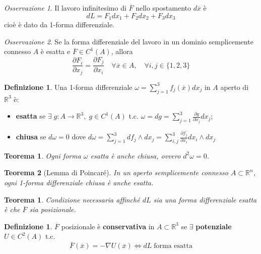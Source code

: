 \documentclass{book}
\theoremstyle{plain}
\newtheorem{teo}{Teorema}[chapter]
\newtheorem*{teo*}{Teorema}
\theoremstyle{plain}
\theoremstyle{plain}
\theoremstyle{plain}
\theoremstyle{plain}
\theoremstyle{definition}
\newtheorem{defi}{Definizione}[chapter]
\newtheorem*{defi*}{Definizione}
\theoremstyle{remark}
\newtheorem*{oss}{Osservazione}
\theoremstyle{definition}
\begin{document}
\begin{oss}
     Il lavoro infinitesimo di $\overline{F}$ nello spostamento $d\overline{x}$ è
     \begin{displaymath}
         d L=F_{1} d x_{1}+F_{2} d x_{2}+F_{3} d x_{3}
     \end{displaymath}
      cioè è dato da 1-forma differenziale.
\end{oss}

\begin{oss}
    Se la forma differenziale del lavoro in un dominio semplicemente connesso $A$ è esatta e $\overline{F} \in C^1(A)$, allora
    \begin{displaymath}
         \frac{\partial F_{i}}{\partial x_{j}}=\frac{\partial F_{j}}{\partial x_{i}} \quad \forall \overline{x} \in A, \quad \forall i, j \in \{1, 2, 3\}
    \end{displaymath}
\end{oss}

\begin{defi*}
\everymath{\displaystyle}
    Una 1-forma differenziale $\omega=\sum_{j=1}^{3} f_{j}(\overline{x}) dx_{j}$ in $A$ aperto di $\mathbb{R}^{3}$ è:
    \begin{itemize}
    \everymath{\displaystyle}
        \item \textbf{esatta} se $\exists \; g: A \to \mathbb{R}^{3}, \; g \in C^{1}(A)$ t.c. $\omega=dg=\sum_{j=1}^{3} \frac{\partial g}{\partial x_{j}} dx_{j}$;
        \item \textbf{chiusa} se $d\omega=0$ dove $d\omega=\sum_{j=1}^{3} df_j \wedge dx_{j}=\sum_{i, j}^{3}\frac{\partial f_j}{\partial x_i}dx_i \wedge dx_j$
    \end{itemize}
\end{defi*}

\begin{teo*}
    Ogni forma $\omega$ esatta è anche chiusa, ovvero $d^{2} \omega=0$.
\end{teo*}

\begin{teo*}[Lemma di Poincaré]
    In un aperto semplicemente connesso $A \subset \mathbb{R}^{n}$, ogni 1-forma differenziale chiusa è anche esatta.
\end{teo*}

\begin{teo}
    Condizione necessaria affinché $dL$ sia una forma differenziale esatta è che $\overline{F}$ sia posizionale.
\end{teo}

\begin{defi}
    $\overline{F}$ posizionale è \textbf{conservativa} in $A \subset \mathbb{R}^{3}$ se $\exists$ \textbf{potenziale} $U \in C^{2}(A)$ t.c.
    \begin{displaymath}
        \boxed{\overline{F}(\overline{x})=-\nabla U(\overline{x})} \iff dL \; \text{forma esatta}
    \end{displaymath}
\end{defi}
\end{document}
